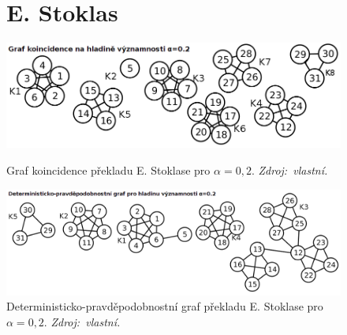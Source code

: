 \documentclass[dp.tex]{subfiles}
\begin{document}
\begin{figure}[h]
\section*{E. Stoklas}
	\centering
	\includegraphics[max width=\textwidth,keepaspectratio=true]{imgs-99-priloha-d/h_k_20}
	\caption[Graf koincidence překladu E. Stoklase pro $\alpha = 0{,}2$]
            {Graf koincidence překladu E. Stoklase pro $\alpha = 0{,}2$. \textit{Zdroj:~vlastní.}}
	\label{fig:h_k_20}

	\includegraphics[max width=\textwidth,keepaspectratio=true]{imgs-99-priloha-d/h_d_20}
	\caption[Deterministicko-pravděpodobnostní graf překladu E. Stoklase pro $\alpha = 0{,}2$]
            {Deterministicko-pravděpodobnostní graf překladu E. Stoklase pro $\alpha = 0{,}2$. \textit{Zdroj:~vlastní.}}
	\label{fig:h_d_20}
\end{figure}
\end{document}
